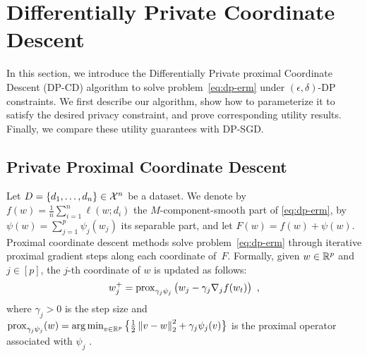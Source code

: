 


\section{Differentially Private Coordinate Descent}
\label{sec:diff-priv-coord}

In this section, we introduce the
Differentially Private proximal Coordinate Descent (DP-CD) algorithm to
solve problem~\eqref{eq:dp-erm} under $(\epsilon,\delta)$-DP constraints.
We first describe our algorithm, show how to parameterize it to
satisfy the desired privacy constraint, and prove corresponding utility
results.
Finally, we compare these utility guarantees with DP-SGD.

\subsection{Private Proximal Coordinate Descent}

Let $D = \{d_1, \dots, d_n\} \in \mathcal X^n$ be a dataset.
We denote by $f(w) = \frac{1}{n}\sum_{i=1}^n \ell(w; d_i)$ the $M$-component-smooth
part of \eqref{eq:dp-erm},
by $\psi(w) = \sum_{j=1}^p \psi_j(w_j)$ its separable part,
and let $F(w) = f(w) + \psi(w)$.
Proximal coordinate descent methods \cite{richtarik2014Iteration}
solve problem~\eqref{eq:dp-erm} through iterative proximal gradient
steps along each coordinate of~$F$.
Formally, given $w \in \mathbb R^p$ and $j \in [p]$, the $j$-th coordinate of
$w$ is updated as follows:
\begin{align}
  \label{eq:proximal-update-nonoise}
  w_j^+ = \operatorname{prox}_{\gamma_j\psi_j} \big(w_j - \gamma_j
  \nabla_j f(w_t)\big)\enspace,
\end{align}
where $\gamma_j>0$ is the step size and $\operatorname{prox}_{\gamma_j\psi_j}
(w)= \smash{\operatorname*{arg\,min}_{v\in\mathbb R^p} \big
\{ \frac{1}{2} \left \lVert v - w \right \rVert_2^2 + \gamma_j\psi_j(v) \big\}}$ is the proximal
operator associated with $\psi_j$ \citep{parikh2014Proximal}.

